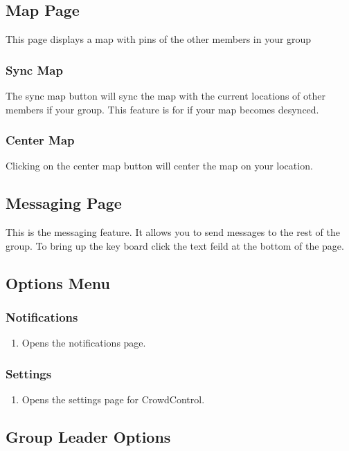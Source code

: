  
 \subsection{Map Page}
 This page displays a map with pins of the other members in your group
 
 \subsubsection{Sync Map}
 The sync map button will sync the map with the current locations of other members if your group. This feature is for if your map becomes desynced.
 
 \subsubsection{Center Map}
 Clicking on the center map button will center the map on your location.

 \subsection{Messaging Page}
 This is the messaging feature. It allows you to send messages to the rest of the group. To bring up the key board click the text feild at the bottom of the page.
 
 \subsection{Options Menu}
 	\subsubsection{ Notifications}
 		\begin{enumerate}
		\item Opens the notifications page.
 		\end{enumerate}
 	\subsubsection{Settings}
 	\begin{enumerate}
		\item Opens the settings page for CrowdControl.
 	\end{enumerate}
 	
 \subsection{Group Leader Options}

